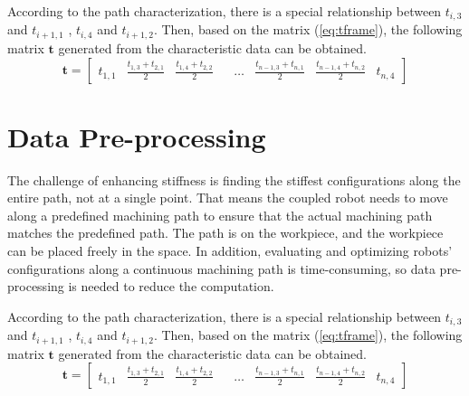 According to the path characterization, there is a special relationship between $t_{i,3}$ and $t_{i+1,1}$ , $t_{i,4}$ and $t_{i+1,2}$. Then, based on the matrix (\ref{eq:tframe}), the following matrix $\boldsymbol{t}$ generated from the characteristic data can be obtained.
\begin{equation}
  \boldsymbol{t} =  \begin{bmatrix}
       t_{1,1} & \frac{t_{1,3}+t_{2,1}}{2} & \frac{t_{1,4}+t_{2,2}}{2} &  & \dots & \frac{t_{n-1,3}+t_{n,1}}{2} & \frac{t_{n-1,4}+t_{n,2}}{2} & t_{n,4} \end{bmatrix}
       \label{eq:t}
\end{equation}



\section{Data Pre-processing} \label{sec:Main:Pre-processing}
The challenge of enhancing stiffness is finding the stiffest configurations along the entire path, not at a single point. That means the coupled robot needs to move along a predefined machining path to ensure that the actual machining path matches the predefined path. The path is on the workpiece, and the workpiece can be placed freely in the space. In addition, evaluating and optimizing robots' configurations along a continuous machining path is time-consuming, so data pre-processing is needed to reduce the computation.


According to the path characterization, there is a special relationship between $t_{i,3}$ and $t_{i+1,1}$ , $t_{i,4}$ and $t_{i+1,2}$. Then, based on the matrix (\ref{eq:tframe}), the following matrix $\boldsymbol{t}$ generated from the characteristic data can be obtained.
\begin{equation}
  \boldsymbol{t} =  \begin{bmatrix}
       t_{1,1} & \frac{t_{1,3}+t_{2,1}}{2} & \frac{t_{1,4}+t_{2,2}}{2} &  & \dots & \frac{t_{n-1,3}+t_{n,1}}{2} & \frac{t_{n-1,4}+t_{n,2}}{2} & t_{n,4} \end{bmatrix}
       \label{eq:t}
\end{equation}
